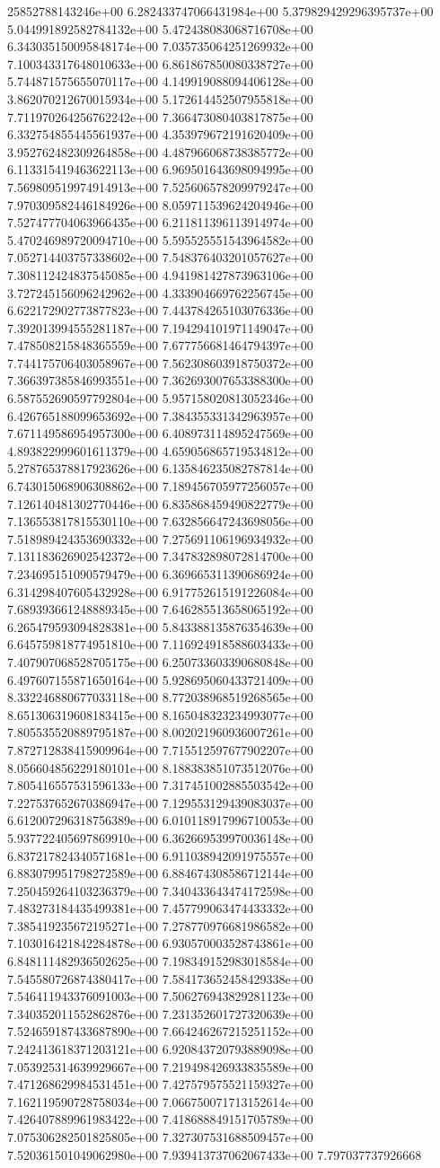25852788143246e+00	6.282433747066431984e+00	5.379829429296395737e+00	5.044991892582784132e+00	5.472438083068716708e+00	6.343035150095848174e+00	7.035735064251269932e+00	7.100343317648010633e+00	6.861867850080338727e+00	5.744871575655070117e+00	4.149919088094406128e+00	3.862070212670015934e+00	5.172614452507955818e+00	7.711970264256762242e+00	7.366473080403817875e+00	6.332754855445561937e+00	4.353979672191620409e+00	3.952762482309264858e+00	4.487966068738385772e+00	6.113315419463622113e+00	6.969501643698094995e+00	7.569809519974914913e+00	7.525606578209979247e+00	7.970309582446184926e+00	8.059711539624204946e+00	7.527477704063966435e+00	6.211811396113914974e+00	5.470246989720094710e+00	5.595525551543964582e+00	7.052714403757338602e+00	7.548376403201057627e+00	7.308112424837545085e+00	4.941981427873963106e+00	3.727245156096242962e+00	4.333904669762256745e+00	6.622172902773877823e+00	7.443784265103076336e+00	7.392013994555281187e+00	7.194294101971149047e+00	7.478508215848365559e+00	7.677756681464794397e+00	7.744175706403058967e+00	7.562308603918750372e+00	7.366397385846993551e+00	7.362693007653388300e+00	6.587552690597792804e+00	5.957158020813052346e+00	6.426765188099653692e+00	7.384355331342963957e+00	7.671149586954957300e+00	6.408973114895247569e+00	4.893822999601611379e+00	4.659056865719534812e+00	5.278765378817923626e+00	6.135846235082787814e+00	6.743015068906308862e+00	7.189456705977256057e+00	7.126140481302770446e+00	6.835868459490822779e+00	7.136553817815530110e+00	7.632856647243698056e+00	7.518989424353690332e+00	7.275691106196934932e+00	7.131183626902542372e+00	7.347832898072814700e+00	7.234695151090579479e+00	6.369665311390686924e+00	6.314298407605432928e+00	6.917752615191226084e+00	7.689393661248889345e+00	7.646285513658065192e+00	6.265479593094828381e+00	5.843388135876354639e+00	6.645759818774951810e+00	7.116924918588603433e+00	7.407907068528705175e+00	6.250733603390680848e+00	6.497607155871650164e+00	5.928695060433721409e+00	8.332246880677033118e+00	8.772038968519268565e+00	8.651306319608183415e+00	8.165048323234993077e+00	7.805535520889795187e+00	8.002021960936007261e+00	7.872712838415909964e+00	7.715512597677902207e+00	8.056604856229180101e+00	8.188383851073512076e+00	7.805416557531596133e+00	7.317451002885503542e+00	7.227537652670386947e+00	7.129553129439083037e+00	6.612007296318756389e+00	6.010118917996710053e+00	5.937722405697869910e+00	6.362669539970036148e+00	6.837217824340571681e+00	6.911038942091975557e+00	6.883079951798272589e+00	6.884674308586712144e+00	7.250459264103236379e+00	7.340433643474172598e+00	7.483273184435499381e+00	7.457799063474433332e+00	7.385419235672195271e+00	7.278770976681986582e+00	7.103016421842284878e+00	6.930570003528743861e+00	6.848111482936502625e+00	7.198349152983018584e+00	7.545580726874380417e+00	7.584173652458429338e+00	7.546411943376091003e+00	7.506276943829281123e+00	7.340352011552862876e+00	7.231352601727320639e+00	7.524659187433687890e+00	7.664246267215251152e+00	7.242413618371203121e+00	6.920843720793889098e+00	7.053925314639929667e+00	7.219498426933835589e+00	7.471268629984531451e+00	7.427579575521159327e+00	7.162119590728758034e+00	7.066750071713152614e+00	7.426407889961983422e+00	7.418688849151705789e+00	7.075306282501825805e+00	7.327307531688509457e+00	7.520361501049062980e+00	7.939413737062067433e+00	7.797037737926668
